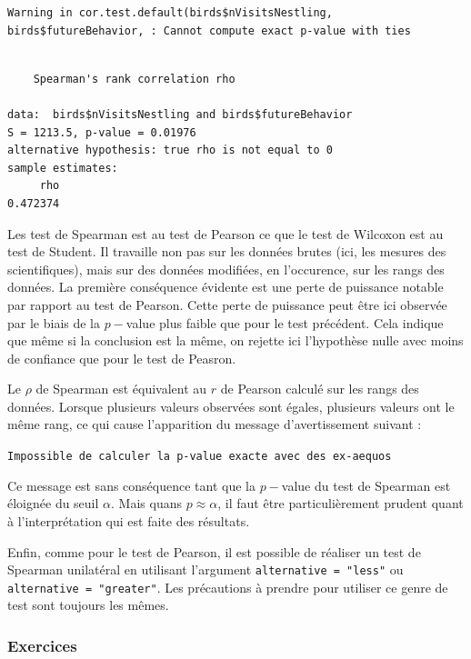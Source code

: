 \documentclass[a4paperpaper,]{article}
\begin{document}
\begin{verbatim}
Warning in cor.test.default(birds$nVisitsNestling,
birds$futureBehavior, : Cannot compute exact p-value with ties
\end{verbatim}

\begin{verbatim}

    Spearman's rank correlation rho

data:  birds$nVisitsNestling and birds$futureBehavior
S = 1213.5, p-value = 0.01976
alternative hypothesis: true rho is not equal to 0
sample estimates:
     rho 
0.472374 
\end{verbatim}

Les test de Spearman est au test de Pearson ce que le test de Wilcoxon est au test de Student. Il travaille non pas sur les données brutes (ici, les mesures des scientifiques), mais sur des données modifiées, en l'occurence, sur les rangs des données. La première conséquence évidente est une perte de puissance notable par rapport au test de Pearson. Cette perte de puissance peut être ici observée par le biais de la \(p-\)value plus faible que pour le test précédent. Cela indique que même si la conclusion est la même, on rejette ici l'hypothèse nulle avec moins de confiance que pour le test de Peasron.

Le \(\rho\) de Spearman est équivalent au \(r\) de Pearson calculé sur les rangs des données. Lorsque plusieurs valeurs observées sont égales, plusieurs valeurs ont le même rang, ce qui cause l'apparition du message d'avertissement suivant :

\texttt{Impossible\ de\ calculer\ la\ p-value\ exacte\ avec\ des\ ex-aequos}

Ce message est sans conséquence tant que la \(p-\)value du test de Spearman est éloignée du seuil \(\alpha\). Mais quans \(p \approx \alpha\), il faut être particulièrement prudent quant à l'interprétation qui est faite des résultats.

Enfin, comme pour le test de Pearson, il est possible de réaliser un test de Spearman unilatéral en utilisant l'argument \texttt{alternative\ =\ "less"} ou \texttt{alternative\ =\ "greater"}. Les précautions à prendre pour utiliser ce genre de test sont toujours les mêmes.

\hypertarget{exercices}{%
\subsubsection{Exercices}\label{exercices}}
\end{document}
